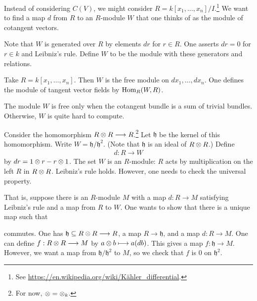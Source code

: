 \documentclass[11pt, oneside,margin=1in]{article}
\begin{document}
Instead of considering $C(V)$, we might consider $R=k[x_1,\hdots, x_n]/I$.\footnote{See \url{https://en.wikipedia.org/wiki/Kähler_differential}.} We want to find a map $d$ from $R$ to an $R$-module $W$ that one thinks of as the module of cotangent vectors.

Note that $W$ is generated over $R$ by elements $dr$ for $r\in R$. One asserts $dr=0$ for $r\in k$ and Leibniz's rule. Define $W$ to be the module with these generators and relations.

\begin{example}[ ]\label{}\text{}
Take $R=k[x_1,\hdots, x_n]$. Then $W$ is the free module on $dx_1,\hdots, dx_n$. One defines the module of tangent vector fields by $\operatorname{Hom}_{R}(W, R)$.
\end{example}

\begin{remark}
	The module $W$ is free only when the cotangent bundle is a sum of trivial bundles. Otherwise, $W$ is quite hard to compute.
\end{remark}

Consider the homomorphism $R\otimes R\longrightarrow R$.\footnote{For now, $\otimes=\otimes_k$.} Let $\mathfrak{h}$ be the kernel of this homomorphism. Write $W = \mathfrak{h}/\mathfrak{h}^2$. (Note that $\mathfrak{h}$ is an ideal of $R\otimes R$.) Define 
\begin{align*}
	d :R\longrightarrow W
\end{align*}
by $dr = 1\otimes r - r\otimes 1$. The set $W$ is an $R$-module: $R$ acts by multiplication on the left $R$ in $R\otimes R$. Leibniz's rule holds. However, one needs to check the universal property.

That is, suppose there is an $R$-module $M$ with a map $d:R\longrightarrow M$ satisfying Leibniz's rule and a map from $R$ to $W$. One wants to show that there is a unique map such that
\begin{center}
\end{center}
commutes. One has $\mathfrak{h}\subseteq R\otimes R\longrightarrow R$, a map $R\longrightarrow \mathfrak{h}$, and a map $d:R\longrightarrow M$. One can define $f:R\otimes R\longrightarrow M$ by $a\otimes b \longmapsto a(db)$. This gives a map $f:\mathfrak{h}\longrightarrow M$. However, we want a map from $\mathfrak{h}/\mathfrak{h}^2$ to $M$, so we check that $f$ is $0$ on $\mathfrak{h}^2$.
\end{document}
